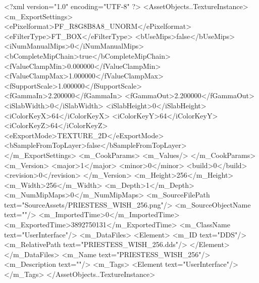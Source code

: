 <?xml version="1.0" encoding="UTF-8" ?>
<AssetObjects..TextureInstance>
	<m_ExportSettings>
		<ePixelformat>PF_R8G8B8A8_UNORM</ePixelformat>
		<eFilterType>FT_BOX</eFilterType>
		<bUseMips>false</bUseMips>
		<iNumManualMips>0</iNumManualMips>
		<bCompleteMipChain>true</bCompleteMipChain>
		<fValueClampMin>0.000000</fValueClampMin>
		<fValueClampMax>1.000000</fValueClampMax>
		<fSupportScale>1.000000</fSupportScale>
		<fGammaIn>2.200000</fGammaIn>
		<fGammaOut>2.200000</fGammaOut>
		<iSlabWidth>0</iSlabWidth>
		<iSlabHeight>0</iSlabHeight>
		<iColorKeyX>64</iColorKeyX>
		<iColorKeyY>64</iColorKeyY>
		<iColorKeyZ>64</iColorKeyZ>
		<eExportMode>TEXTURE_2D</eExportMode>
		<bSampleFromTopLayer>false</bSampleFromTopLayer>
	</m_ExportSettings>
	<m_CookParams>
		<m_Values/>
	</m_CookParams>
	<m_Version>
		<major>1</major>
		<minor>0</minor>
		<build>0</build>
		<revision>0</revision>
	</m_Version>
	<m_Height>256</m_Height>
	<m_Width>256</m_Width>
	<m_Depth>1</m_Depth>
	<m_NumMipMaps>0</m_NumMipMaps>
	<m_SourceFilePath text="SourceAssets/PRIESTESS_WISH_256.png"/>
	<m_SourceObjectName text=""/>
	<m_ImportedTime>0</m_ImportedTime>
	<m_ExportedTime>3892750131</m_ExportedTime>
	<m_ClassName text="UserInterface"/>
	<m_DataFiles>
		<Element>
			<m_ID text="DDS"/>
			<m_RelativePath text="PRIESTESS_WISH_256.dds"/>
		</Element>
	</m_DataFiles>
	<m_Name text="PRIESTESS_WISH_256"/>
	<m_Description text=""/>
	<m_Tags>
		<Element text="UserInterface"/>
	</m_Tags>
</AssetObjects..TextureInstance>

